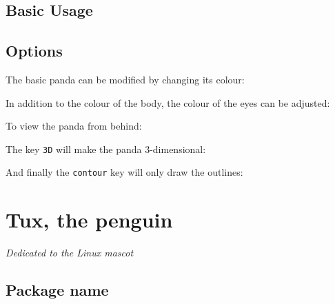 \documentclass[parskip=half]{scrartcl}
\begin{document}
\subsection{Basic Usage}

\begin{tcblisting}{}
\panda
\end{tcblisting}

\subsection{Options}

The basic panda can be modified by changing its colour:
\begin{tcblisting}{}
\panda[body=blue]
\end{tcblisting}

In addition to the colour of the body, the colour of the eyes can be adjusted:
\begin{tcblisting}{}
\panda[eye=red]
\end{tcblisting}
\begin{tcblisting}{}
\panda[pupil=red]
\end{tcblisting}

To view the panda from behind:
\begin{tcblisting}{}
\panda[back]
\end{tcblisting}

The key \lstinline|3D| will make the panda 3-dimensional:
\begin{tcblisting}{}
\panda[3D]
\end{tcblisting}

And finally the \lstinline|contour| key will only draw the outlines:
\begin{tcblisting}{}
\panda[contour=black]
\end{tcblisting}

%
%
\clearpage
\section[Penguin]{Tux, the penguin}

\emph{Dedicated to the Linux mascot}

\subsection{Package name}
\end{document}

